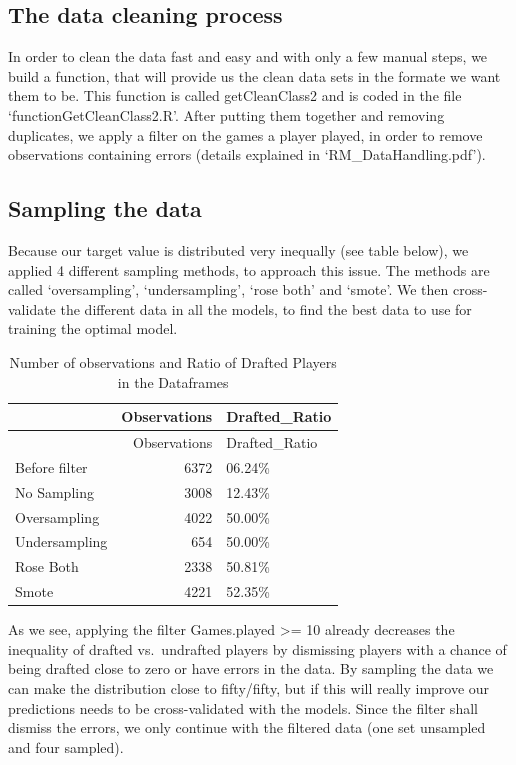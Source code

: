 \documentclass[]{article}
\begin{document}
\hypertarget{the-data-cleaning-process-1}{%
\subsection{The data cleaning
process}\label{the-data-cleaning-process-1}}

In order to clean the data fast and easy and with only a few manual
steps, we build a function, that will provide us the clean data sets in
the formate we want them to be. This function is called getCleanClass2
and is coded in the file `functionGetCleanClass2.R'. After putting them
together and removing duplicates, we apply a filter on the games a
player played, in order to remove observations containing errors
(details explained in `RM\_DataHandling.pdf').

\hypertarget{sampling-the-data-1}{%
\subsection{Sampling the data}\label{sampling-the-data-1}}

Because our target value is distributed very inequally (see table
below), we applied 4 different sampling methods, to approach this issue.
The methods are called `oversampling', `undersampling', `rose both' and
`smote'. We then cross-validate the different data in all the models, to
find the best data to use for training the optimal model.

\begin{longtable}[]{@{}lrl@{}}
\caption{Number of observations and Ratio of Drafted Players in the
Dataframes}\tabularnewline
\toprule
& Observations & Drafted\_Ratio\tabularnewline
\midrule
\endfirsthead
\toprule
& Observations & Drafted\_Ratio\tabularnewline
\midrule
\endhead
Before filter & 6372 & 06.24\%\tabularnewline
No Sampling & 3008 & 12.43\%\tabularnewline
Oversampling & 4022 & 50.00\%\tabularnewline
Undersampling & 654 & 50.00\%\tabularnewline
Rose Both & 2338 & 50.81\%\tabularnewline
Smote & 4221 & 52.35\%\tabularnewline
\bottomrule
\end{longtable}

As we see, applying the filter Games.played \textgreater= 10 already
decreases the inequality of drafted vs.~undrafted players by dismissing
players with a chance of being drafted close to zero or have errors in
the data. By sampling the data we can make the distribution close to
fifty/fifty, but if this will really improve our predictions needs to be
cross-validated with the models. Since the filter shall dismiss the
errors, we only continue with the filtered data (one set unsampled and
four sampled).
\end{document}
